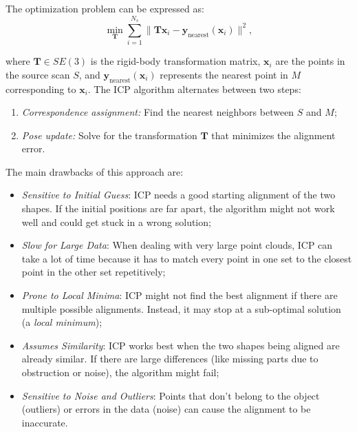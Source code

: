 The optimization problem can be expressed as:
\begin{equation}
    \min_{\mathbf{T}} \sum_{i=1}^{N_s} \| \mathbf{T} \mathbf{x}_i - \mathbf{y}_{\text{nearest}}(\mathbf{x}_i) \|^2,
\end{equation}

where \( \mathbf{T} \in SE(3) \) is the rigid-body transformation matrix, \( \mathbf{x}_i \) are the points in the source scan \( S \), and \( \mathbf{y}_{\text{nearest}}(\mathbf{x}_i) \) represents the nearest point in \( M \) corresponding to \( \mathbf{x}_i \). 
The ICP algorithm alternates between two steps:
\begin{enumerate}
    \item \textit{Correspondence assignment:} Find the nearest neighbors between \( S \) and \( M \);
    \item \textit{Pose update:} Solve for the transformation \( \mathbf{T} \) that minimizes the alignment error.
\end{enumerate} 
The main drawbacks of this approach are:
\begin{itemize}
    \item \textit{Sensitive to Initial Guess}: ICP needs a good starting alignment of the two shapes. If the initial positions are far apart, the algorithm might not work well and could get stuck in a wrong solution;
    \item \textit{Slow for Large Data}: When dealing with very large point clouds, ICP can take a lot of time because it has to match every point in one set to the closest point in the other set repetitively;
    \item \textit{Prone to Local Minima}: ICP might not find the best alignment if there are multiple possible alignments. Instead, it may stop at a sub-optimal solution (a \textit{local minimum});
    \item \textit{Assumes Similarity}: ICP works best when the two shapes being aligned are already similar. If there are large differences (like missing parts due to obstruction or noise), the algorithm might fail;
    \item \textit{Sensitive to Noise and Outliers}: Points that don’t belong to the object (outliers) or errors in the data (noise) can cause the alignment to be inaccurate.
\end{itemize}

